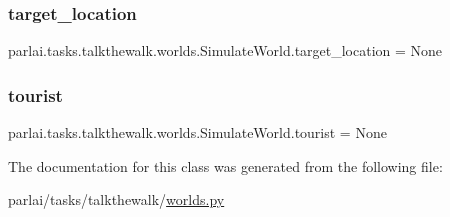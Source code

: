 \subsubsection{\texorpdfstring{target\+\_\+location}{target\_location}}
{\footnotesize\ttfamily parlai.\+tasks.\+talkthewalk.\+worlds.\+Simulate\+World.\+target\+\_\+location = None\hspace{0.3cm}{\ttfamily [static]}}

\mbox{\label{classparlai_1_1tasks_1_1talkthewalk_1_1worlds_1_1SimulateWorld_abfa37e958248323fcffa9455487dca0c}} 
\subsubsection{\texorpdfstring{tourist}{tourist}}
{\footnotesize\ttfamily parlai.\+tasks.\+talkthewalk.\+worlds.\+Simulate\+World.\+tourist = None\hspace{0.3cm}{\ttfamily [static]}}



The documentation for this class was generated from the following file\+:\begin{DoxyCompactItemize}
\item 
parlai/tasks/talkthewalk/\hyperlink{parlai_2tasks_2talkthewalk_2worlds_8py}{worlds.\+py}\end{DoxyCompactItemize}

